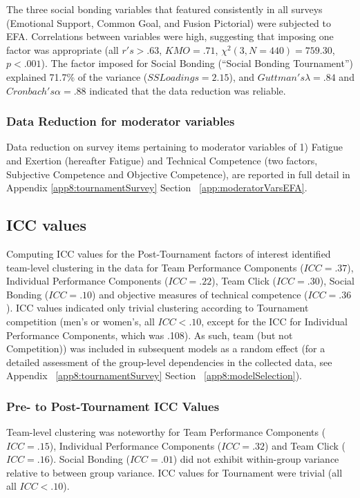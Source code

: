 \begin{CJK}{UTF8}{gbsn}
The three social bonding variables that featured consistently in all surveys (Emotional Support, Common Goal, and Fusion Pictorial) were subjected to EFA.  Correlations between variables were high, suggesting that imposing one factor was appropriate (all $r's > .63$, $KMO = .71$, $\chi^2(3, N = 440) =  759.30$, $p < .001$).  The factor imposed for Social Bonding (``Social Bonding Tournament'') explained 71.7\% of the variance ($SS Loadings =  2.15$), and $Guttman's \lambda =.84$ and $Cronbach's \alpha= .88$ indicated that the data reduction was reliable.

\subsubsection{Data Reduction for moderator variables}
Data reduction on survey items pertaining to moderator variables of 1) Fatigue and Exertion (hereafter Fatigue) and Technical Competence (two factors, Subjective Competence and Objective Competence), are reported in full detail in Appendix \ref{app8:tournamentSurvey} Section ~\ref{app:moderatorVarsEFA}.



\subsection{ICC values}


Computing ICC values for the Post-Tournament factors of interest identified team-level clustering in the data for Team Performance Components ($ICC = .37$), Individual Performance Components ($ICC = .22$), Team Click ($ICC = .30$), Social Bonding ($ICC = .10$) and objective measures of technical competence ($ICC = .36$).  ICC values indicated only trivial clustering according to Tournament competition (men's or women's, all $ICC < .10$, except for the ICC for Individual Performance Components, which was .108).  As such, team (but not Competition)) was included in subsequent models as a random effect (for a detailed assessment of the group-level dependencies in the collected data, see Appendix ~\ref{app8:tournamentSurvey} Section ~\ref{app8:modelSelection}).


\subsubsection{Pre- to Post-Tournament ICC Values}
Team-level clustering was noteworthy for
Team Performance Components ($ICC = .15$), Individual Performance Components ($ICC = .32$) and Team Click ($ICC = .16$).  Social Bonding ($ICC = .01$) did not exhibit within-group variance relative to between group variance. ICC values for Tournament were trivial (all all $ICC < .10$).


\end{CJK}
